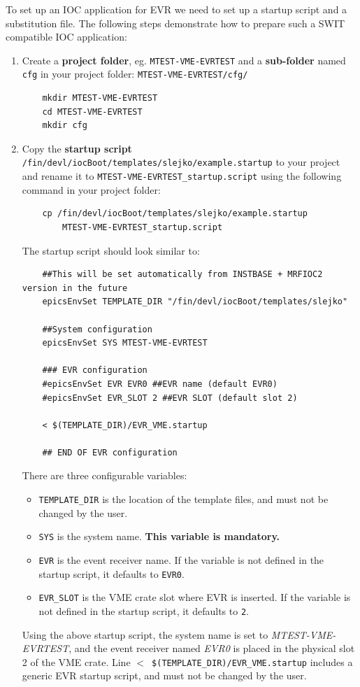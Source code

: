 \documentclass[12pt,a4paper]{article}
\begin{document}
To set up an IOC application for EVR we need to set up a startup script and a substitution file. The following steps demonstrate how to prepare such a SWIT compatible IOC application:
\begin{enumerate}

	\item Create a \textbf{project folder}, eg. \texttt{MTEST-VME-EVRTEST} and a \textbf{sub-folder} named \texttt{cfg} in your project folder: \texttt{MTEST-VME-EVRTEST/cfg/}
\begin{verbatim}
	mkdir MTEST-VME-EVRTEST
	cd MTEST-VME-EVRTEST
	mkdir cfg
\end{verbatim}

	\item Copy the \textbf{startup script} \texttt{/fin/devl/iocBoot/templates/slejko/example.startup} to your project and rename it to \texttt{MTEST-VME-EVRTEST\_startup.script} using the following command in your project folder:
\begin{verbatim}
	cp /fin/devl/iocBoot/templates/slejko/example.startup 
	    MTEST-VME-EVRTEST_startup.script
\end{verbatim}

	The startup script should look similar to:
\begin{verbatim}
	##This will be set automatically from INSTBASE + MRFIOC2 version in the future
	epicsEnvSet TEMPLATE_DIR "/fin/devl/iocBoot/templates/slejko"
	
	##System configuration
	epicsEnvSet SYS MTEST-VME-EVRTEST
	
	### EVR configuration
	#epicsEnvSet EVR EVR0 ##EVR name (default EVR0)
	#epicsEnvSet EVR_SLOT 2 ##EVR SLOT (default slot 2)
	
	< $(TEMPLATE_DIR)/EVR_VME.startup
	
	## END OF EVR configuration
\end{verbatim}

There are three configurable variables:
\begin{itemize}
	\item 
		\texttt{TEMPLATE\_DIR} is the location of the template files, and must not be changed by the user.
	\item
		\texttt{SYS} is the system name. \textbf{This variable is mandatory.}
	\item 
		\texttt{EVR} is the event receiver name. If the variable is not defined in the startup script, it defaults to \texttt{EVR0}.
	\item 
		\texttt{EVR\_SLOT} is the VME crate slot where EVR is inserted. If the variable is not defined in the startup script, it defaults to \texttt{2}.
\end{itemize}
Using the above startup script, the system name is set to \textit{MTEST-VME-EVRTEST}, and the event receiver named \textit{EVR0} is placed in the physical slot 2 of the VME crate. Line \texttt{$<$ \$(TEMPLATE\_DIR)/EVR\_VME.startup} includes a generic EVR startup script, and must not be changed by the user.


\end{enumerate}
\end{document}
